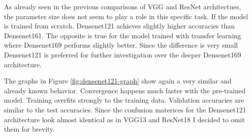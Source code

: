 \begin{table}[h] \centering
{}
\caption{Hyper parameters for densenet121 optimized with SigOpt. First row shows hyperparameters training the architecture from scratch. Second row used pre-trained weights from ImageNet}
\label{tbl:Densenet121_overview}
\end{table}

As already seen in the previous comparisons of VGG and ResNet architectues, the parameter size does not seem to play a role in this specific task. If the model is trained from scratch, Densenet121 achieves slightly higher accuracies than Densenet161. The opposite is true for the model trained with transfer learning where Densenet169 performs slightly better. Since the difference is very small Densenet121 is preferred for further investigation over the deeper Densenet169 architecture.

The graphs in Figure \ref{fig:densenet121-graph} show again a very similar and already known behavior. Convergence happens much faster with the pre-trained model. Training overfits strongly to the training data. Validation accuracies are similar to the test accuracies. Since the confusion materices for the Densenet121 architecture look almost identical as in VGG13 and ResNet18 I decided to omit them for brevity.

